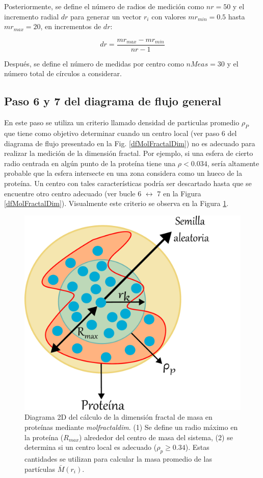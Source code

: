  	Posteriormente, se define el número de radios de medición como \(nr = 50\) y el incremento radial \(dr\) 
 	para  generar un vector \(r_i\) con valores \(mr_{min}= 0.5\) hasta \(mr_{max} = 20\), en incrementos de \(dr\):
 
 	\begin{equation}
 		 	dr = \frac{mr_{max} - mr_{min}}{nr - 1}
 	\end{equation}
	
	 Después, se define el n\'{u}mero de medidas por centro como \(nMeas = 30\) y el n\'{u}mero total 
	 de c\'{i}rculos a considerar.
	 
	 
	 \subsection{Paso 6 y 7 del diagrama de flujo general}
	 
	 En este paso se utiliza un criterio llamado densidad de particulas promedio \(\rho_{P}\) que tiene como objetivo determinar cuando un centro local (ver paso 6 del diagrama de flujo presentado en la Fig. \ref{dfMolFractalDim}) no es adecuado para realizar la medici\'{o}n de la dimensi\'{o}n fractal. Por ejemplo, si una esfera de cierto radio centrada en alg\'{u}n punto de la proteína tiene una $\rho < 0.034$, ser\'{i}a altamente probable que la esfera intersecte en una zona considera como un hueco de la prote\'{i}na. Un centro con tales caracter\'{i}sticas podr\'{i}a ser descartado hasta que se encuentre otro centro adecuado (ver bucle 6 $\longleftrightarrow$ 7 en la Figura \ref{dfMolFractalDim}). Visualmente este criterio se observa en la Figura \ref{fig:centrob}. 
	 
	 	\begin{figure}[H]
	 	\centering
	 	\includegraphics[width=0.5\linewidth]{graphs/centrob4.pdf}
	 	\caption{Diagrama 2D del c\'{a}lculo de la dimensi\'{o}n fractal de masa en prote\'{i}nas mediante \textit{molfractaldim}. (1) Se define un radio m\'{a}ximo en la prote\'{i}na ($R_{max}$) alrededor del centro de masa del sistema, (2) se determina si un centro local es adecuado ($\rho_{p} \geq 0.34$). Estas cantidades se utilizan para calcular la masa promedio de las part\'{i}culas $\bar{M}(r_i)$.}
	 	\label{fig:centrob}
	 \end{figure}
	 
